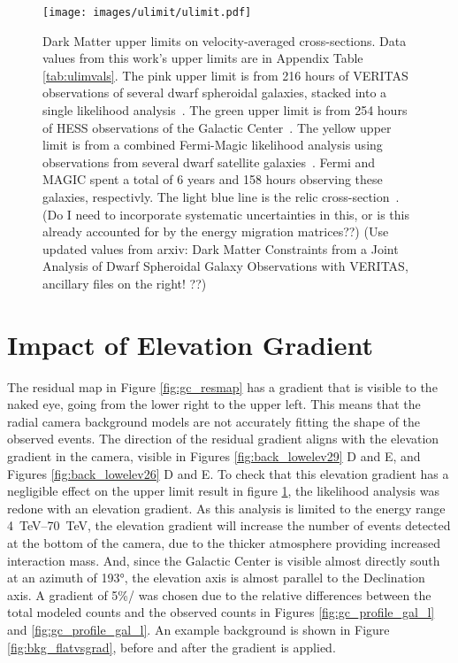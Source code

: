   \begin{figure}[ht]
    \centering
    \texttt{[image: images/ulimit/ulimit.pdf]}
    \caption[Dark Matter Upper Limit Plot]{
      Dark Matter upper limits on velocity-averaged cross-sections.
      Data values from this work's upper limits are in Appendix Table \ref{tab:ulimvals}.
      The pink upper limit is from 216 hours of VERITAS observations of several dwarf spheroidal galaxies, stacked into a single likelihood analysis~\cite{verdsphul}.
      The green upper limit is from 254 hours of HESS observations of the Galactic Center~\cite{hessgcul}.
      The yellow upper limit is from a combined Fermi-Magic likelihood analysis using observations from several dwarf satellite galaxies~\cite{fermagicul}.
      Fermi and MAGIC spent a total of 6 years and 158 hours observing these galaxies, respectivly.
      The light blue line is the relic cross-section~\cite{updatedWIMPRelicCrossSection}.
      {\color{red}(Do I need to incorporate systematic uncertainties in this, or is this already accounted for by the energy migration matrices??)}
      {\color{red}(Use updated values from arxiv: Dark Matter Constraints from a Joint Analysis of Dwarf Spheroidal Galaxy Observations with VERITAS, ancillary files on the right! ??)}
    }
    \label{fig:ulim}
  \end{figure}
  
\FloatBarrier

\section{Impact of Elevation Gradient}\label{sec:elevgradient}

  The residual map in Figure \ref{fig:gc_resmap} has a gradient that is visible to the naked eye, going from the lower right to the upper left.
  This means that the radial camera background models are not accurately fitting the shape of the observed events.
  The direction of the residual gradient aligns with the elevation gradient in the camera, visible in Figures \ref{fig:back_lowelev29} D and E, and Figures \ref{fig:back_lowelev26} D and E.
  To check that this elevation gradient has a negligible effect on the upper limit result in figure \ref{fig:ulim}, the likelihood analysis was redone with an elevation gradient.
  As this analysis is limited to the energy range \SIrange{4}{70}{TeV}, the elevation gradient will increase the number of events detected at the bottom of the camera, due to the thicker atmosphere providing increased interaction mass.
  And, since the Galactic Center is visible almost directly south at an azimuth of \ang{193}, the elevation axis is almost parallel to the Declination axis.
  A gradient of 5\%/\degree{} was chosen due to the relative differences between the total modeled counts and the observed counts in Figures \ref{fig:gc_profile_gal_l} and \ref{fig:gc_profile_gal_l}.
  An example background is shown in Figure \ref{fig:bkg_flatvsgrad}, before and after the gradient is applied.
  

